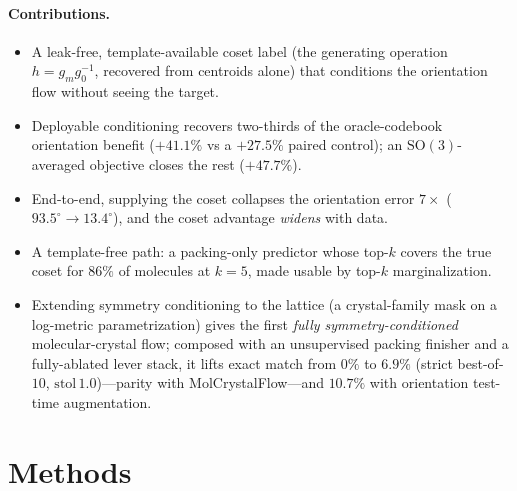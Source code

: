 \documentclass[journal=jcisd8,manuscript=article]{achemso}
\begin{document}
\paragraph{Contributions.}
\begin{itemize}\itemsep0.05em
\item A leak-free, template-available coset label (the generating operation
$h=g_mg_0^{-1}$, recovered from centroids alone) that conditions the orientation
flow without seeing the target.
\item Deployable conditioning recovers two-thirds of the oracle-codebook
orientation benefit ($+41.1\%$ vs a $+27.5\%$ paired control); an
$\mathrm{SO}(3)$-averaged objective closes the rest ($+47.7\%$).
\item End-to-end, supplying the coset collapses the orientation error $7\times$
($93.5^\circ\!\to\!13.4^\circ$), and the coset advantage \emph{widens} with data.
\item A template-free path: a packing-only predictor whose top-$k$ covers the true
coset for $86\%$ of molecules at $k{=}5$, made usable by top-$k$ marginalization.
\item Extending symmetry conditioning to the lattice (a crystal-family mask on a
log-metric parametrization) gives the first \emph{fully symmetry-conditioned}
molecular-crystal flow; composed with an unsupervised packing finisher and a
fully-ablated lever stack, it lifts exact match from $0\%$ to $6.9\%$ (strict
best-of-$10$, $\text{stol}\,1.0$)---parity with MolCrystalFlow---and $10.7\%$ with
orientation test-time augmentation.
\end{itemize}

\section{Methods}
\end{document}
